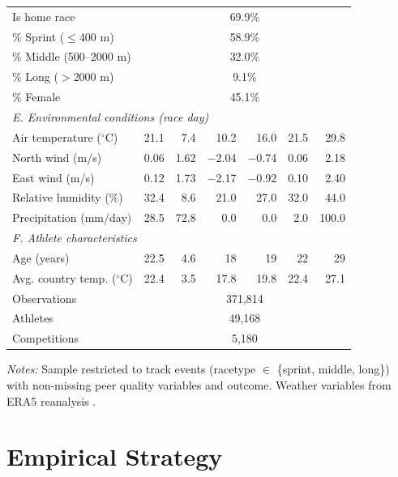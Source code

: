 \documentclass[12pt]{article}
\theoremstyle{definition}
\theoremstyle{remark}
\begin{document}
\begin{table}[H]
\begin{threeparttable}
\begin{tabular}{lrrrrrr}
Is home race & \multicolumn{6}{c}{69.9\%} \\
\% Sprint ($\le$400 m) & \multicolumn{6}{c}{58.9\%} \\
\% Middle (500--2000 m) & \multicolumn{6}{c}{32.0\%} \\
\% Long ($>$2000 m) & \multicolumn{6}{c}{9.1\%} \\
\% Female & \multicolumn{6}{c}{45.1\%} \\
\midrule
\multicolumn{7}{l}{\textit{E. Environmental conditions (race day)}} \\
Air temperature ($^\circ$C) & 21.1 & 7.4 & 10.2 & 16.0 & 21.5 & 29.8 \\
North wind (m/s) & 0.06 & 1.62 & $-$2.04 & $-$0.74 & 0.06 & 2.18 \\
East wind (m/s) & 0.12 & 1.73 & $-$2.17 & $-$0.92 & 0.10 & 2.40 \\
Relative humidity (\%) & 32.4 & 8.6 & 21.0 & 27.0 & 32.0 & 44.0 \\
Precipitation (mm/day) & 28.5 & 72.8 & 0.0 & 0.0 & 2.0 & 100.0 \\
\midrule
\multicolumn{7}{l}{\textit{F. Athlete characteristics}} \\
Age (years) & 22.5 & 4.6 & 18 & 19 & 22 & 29 \\
Avg. country temp. ($^\circ$C) & 22.4 & 3.5 & 17.8 & 19.8 & 22.4 & 27.1 \\
\midrule
Observations & \multicolumn{6}{c}{371,814} \\
Athletes & \multicolumn{6}{c}{49,168} \\
Competitions & \multicolumn{6}{c}{5,180} \\
\bottomrule
\end{tabular}
\begin{tablenotes}
\small
\item \textit{Notes:} Sample restricted to track events (racetype $\in$
\{sprint, middle, long\}) with non-missing peer quality variables and
outcome. Weather variables from ERA5 reanalysis \citep{AragonRezazadeh2025}.
\end{tablenotes}
\end{threeparttable}
\end{table}

\section{Empirical Strategy}
\label{sec:empirics}
\end{document}
